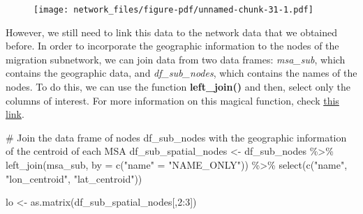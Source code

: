 \documentclass[
  letterpaper,
  DIV=11,
  numbers=noendperiod]{scrreprt}
\newenvironment{Shaded}{\begin{snugshade}}{\end{snugshade}}
\newcommand{\AttributeTok}[1]{\textcolor[rgb]{0.40,0.45,0.13}{#1}}
\newcommand{\CommentTok}[1]{\textcolor[rgb]{0.37,0.37,0.37}{#1}}
\newcommand{\DecValTok}[1]{\textcolor[rgb]{0.68,0.00,0.00}{#1}}
\newcommand{\FunctionTok}[1]{\textcolor[rgb]{0.28,0.35,0.67}{#1}}
\newcommand{\NormalTok}[1]{\textcolor[rgb]{0.00,0.23,0.31}{#1}}
\newcommand{\OtherTok}[1]{\textcolor[rgb]{0.00,0.23,0.31}{#1}}
\newcommand{\SpecialCharTok}[1]{\textcolor[rgb]{0.37,0.37,0.37}{#1}}
\newcommand{\StringTok}[1]{\textcolor[rgb]{0.13,0.47,0.30}{#1}}
\begin{document}
\begin{figure}[H]

{\centering \texttt{[image: network\_files/figure-pdf/unnamed-chunk-31-1.pdf]}

}

\end{figure}

However, we still need to link this data to the network data that we
obtained before. In order to incorporate the geographic information to
the nodes of the migration subnetwork, we can join data from two data
frames: \emph{msa\_sub}, which contains the geographic data, and
\emph{df\_sub\_nodes}, which contains the names of the nodes. To do
this, we can use the function \textbf{left\_join()} and then, select
only the columns of interest. For more information on this magical
function, check
\href{https://dplyr.tidyverse.org/reference/mutate-joins.html}{this
link}.

\begin{Shaded}
\begin{Highlighting}[]
\CommentTok{\# Join the data frame of nodes df\_sub\_nodes with the geographic information of the centroid of each MSA}
\NormalTok{df\_sub\_spatial\_nodes }\OtherTok{\textless{}{-}}\NormalTok{ df\_sub\_nodes }\SpecialCharTok{\%\textgreater{}\%} \FunctionTok{left\_join}\NormalTok{(msa\_sub, }\AttributeTok{by =} \FunctionTok{c}\NormalTok{(}\StringTok{"name"} \OtherTok{=} \StringTok{"NAME\_ONLY"}\NormalTok{)) }\SpecialCharTok{\%\textgreater{}\%} \FunctionTok{select}\NormalTok{(}\FunctionTok{c}\NormalTok{(}\StringTok{"name"}\NormalTok{, }\StringTok{"lon\_centroid"}\NormalTok{, }\StringTok{"lat\_centroid"}\NormalTok{))}
\end{Highlighting}
\end{Shaded}

\begin{Shaded}
\begin{Highlighting}[]
\NormalTok{lo }\OtherTok{\textless{}{-}} \FunctionTok{as.matrix}\NormalTok{(df\_sub\_spatial\_nodes[,}\DecValTok{2}\SpecialCharTok{:}\DecValTok{3}\NormalTok{])}
\end{Highlighting}
\end{Shaded}
\end{document}
